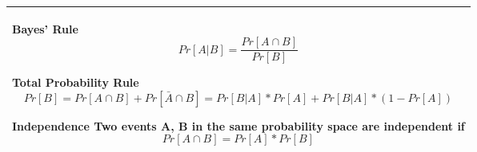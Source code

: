 {\tabulinesep=1mm
\begin{tabu}{|p{16cm} |}
\hline
\vspace{2 mm}
\textbf{Bayes' Rule} 
\[ Pr[A|B] = \frac{Pr[A \cap B]}{Pr[B]} \]

\textbf{Total Probability Rule}
\[ Pr[B] = Pr[A \cap B] + Pr[ \bar{A} \cap B] = Pr[B|A] * Pr[A] + 
Pr[B|A]*(1 - Pr[A])\]

\textbf{Independence} \newline 
Two events A, B in the same probability space are independent if 
\[Pr[A \cap B] = Pr[A] * Pr[B] \]
\\
\hline
\end{tabu}
}